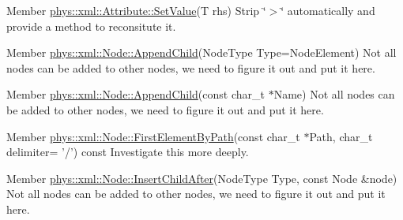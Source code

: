 \begin{DoxyDescription}
\item[Member \hyperlink{classphys_1_1xml_1_1Attribute_af9b12723a227b833d7f8986a524b0e48}{phys::xml::Attribute::SetValue}(T rhs) ]Strip \char`\"{}$>$\char`\"{} automatically and provide a method to reconsitute it. 
\end{DoxyDescription}

\label{dd/da0/todo__todo000049}
\hypertarget{dd/da0/todo__todo000049}{}
 
\begin{DoxyDescription}
\item[Member \hyperlink{classphys_1_1xml_1_1Node_a4971850b72467fcdcf1b3beeb09f26cf}{phys::xml::Node::AppendChild}(NodeType Type=NodeElement) ]Not all nodes can be added to other nodes, we need to figure it out and put it here. 
\end{DoxyDescription}

\label{dd/da0/todo__todo000052}
\hypertarget{dd/da0/todo__todo000052}{}
 
\begin{DoxyDescription}
\item[Member \hyperlink{classphys_1_1xml_1_1Node_a7e9b4518e4d12517bc5ff756054e7395}{phys::xml::Node::AppendChild}(const char\_\-t $\ast$Name) ]Not all nodes can be added to other nodes, we need to figure it out and put it here. 
\end{DoxyDescription}

\label{dd/da0/todo__todo000053}
\hypertarget{dd/da0/todo__todo000053}{}
 
\begin{DoxyDescription}
\item[Member \hyperlink{classphys_1_1xml_1_1Node_af2a9ac5c4e3252dca0e17720de093a9a}{phys::xml::Node::FirstElementByPath}(const char\_\-t $\ast$Path, char\_\-t delimiter= '/') const  ]Investigate this more deeply. 
\end{DoxyDescription}

\label{dd/da0/todo__todo000050}
\hypertarget{dd/da0/todo__todo000050}{}
 
\begin{DoxyDescription}
\item[Member \hyperlink{classphys_1_1xml_1_1Node_affc4d9cc0ea7c89bac58d91a432af2ef}{phys::xml::Node::InsertChildAfter}(NodeType Type, const Node \&node) ]Not all nodes can be added to other nodes, we need to figure it out and put it here. 
\end{DoxyDescription}

